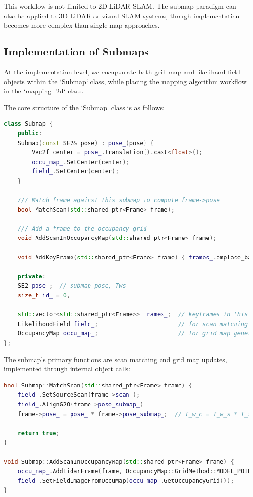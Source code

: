 This workflow is not limited to 2D LiDAR SLAM. The submap paradigm can also be applied to 3D LiDAR or visual SLAM systems, though implementation becomes more complex than single-map approaches.

\subsection{Implementation of Submaps}  
At the implementation level, we encapsulate both grid map and likelihood field objects within the `Submap` class, while placing the mapping algorithm workflow in the `mapping_2d` class.  

The core structure of the `Submap` class is as follows:  
\begin{lstlisting}[language=c++,caption=src/ch6/submap.h]
class Submap {
	public:
	Submap(const SE2& pose) : pose_(pose) {
		Vec2f center = pose_.translation().cast<float>();
		occu_map_.SetCenter(center);
		field_.SetCenter(center);
	}
	
	/// Match frame against this submap to compute frame->pose
	bool MatchScan(std::shared_ptr<Frame> frame);
	
	/// Add a frame to the occupancy grid
	void AddScanInOccupancyMap(std::shared_ptr<Frame> frame);
	
	void AddKeyFrame(std::shared_ptr<Frame> frame) { frames_.emplace_back(frame); }
	
	private:
	SE2 pose_;  // submap pose, Tws
	size_t id_ = 0;
	
	std::vector<std::shared_ptr<Frame>> frames_;  // keyframes in this submap
	LikelihoodField field_;                       // for scan matching
	OccupancyMap occu_map_;                       // for grid map generation
};
\end{lstlisting}

The submap's primary functions are scan matching and grid map updates, implemented through internal object calls:  

\begin{lstlisting}[language=c++,caption=src/ch6/submap.cc]
bool Submap::MatchScan(std::shared_ptr<Frame> frame) {
	field_.SetSourceScan(frame->scan_);
	field_.AlignG2O(frame->pose_submap_);
	frame->pose_ = pose_ * frame->pose_submap_;  // T_w_c = T_w_s * T_s_c
	
	return true;
}

void Submap::AddScanInOccupancyMap(std::shared_ptr<Frame> frame) {
	occu_map_.AddLidarFrame(frame, OccupancyMap::GridMethod::MODEL_POINTS);  // update grid cells
	field_.SetFieldImageFromOccuMap(occu_map_.GetOccupancyGrid());           // update likelihood field
}
\end{lstlisting}

